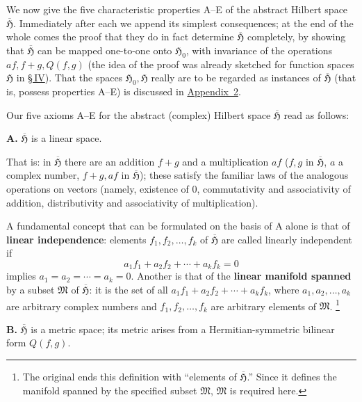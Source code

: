 \documentclass[fontsize=13pt,paper=b5,twoside,bookmarkpackage=false]{scrartcl}
\newcommand{\Sec}[1]{\hyperref[sec:#1]{\S\,#1}}
\newcommand{\App}[1]{\hyperref[app:#1]{Appendix~#1}}
\newcounter{translatornote}
\newcommand{\tnote}[1]{%
  \begingroup\stepcounter{translatornote}%
  \renewcommand{\thefootnote}{T\arabic{translatornote}}%
  \footnote[0]{#1}\endgroup}
\begin{document}
We now give the five characteristic properties A--E of the abstract Hilbert space $\overline{\mathfrak{H}}$. Immediately after each we append its simplest consequences; at the end of the whole comes the proof that they do in fact determine $\overline{\mathfrak{H}}$ completely, by showing that $\overline{\mathfrak{H}}$ can be mapped one-to-one onto $\mathfrak{H}_0$, with invariance of the operations $af,f+g,Q(f,g)$ (the idea of the proof was already sketched for function spaces $\mathfrak{H}$ in \Sec{IV}). That the spaces $\mathfrak{H}_0,\mathfrak{H}$ really are to be regarded as instances of $\overline{\mathfrak{H}}$ (that is, possess properties A--E) is discussed in \App{2}.

Our five axioms A--E for the abstract (complex) Hilbert space $\overline{\mathfrak{H}}$ read as follows:

\par\medskip\noindent\textbf{A.}\label{axiom:A}
$\overline{\mathfrak{H}}$ is a linear space.

That is: in $\overline{\mathfrak{H}}$ there are an addition $f+g$ and a multiplication $af$ ($f,g$ in $\overline{\mathfrak{H}}$, $a$ a complex number, $f+g,af$ in $\overline{\mathfrak{H}}$); these satisfy the familiar laws of the analogous operations on vectors (namely, existence of $0$, commutativity and associativity of addition, distributivity and associativity of multiplication).

A fundamental concept that can be formulated on the basis of A alone is that of \textbf{linear independence}: elements $f_1,f_2,\ldots,f_k$ of $\overline{\mathfrak{H}}$ are called linearly independent if
\[
a_1f_1+a_2f_2+\cdots+a_kf_k=0
\]
implies $a_1=a_2=\cdots=a_k=0$. Another is that of the \textbf{linear manifold spanned} by a subset $\mathfrak{M}$ of $\overline{\mathfrak{H}}$: it is the set of all $a_1f_1+a_2f_2+\cdots+a_kf_k$, where $a_1,a_2,\ldots,a_k$ are arbitrary complex numbers and $f_1,f_2,\ldots,f_k$ are arbitrary elements of $\mathfrak{M}$.\tnote{The original ends this definition with ``elements of $\overline{\mathfrak{H}}$.'' Since it defines the manifold spanned by the specified subset $\mathfrak{M}$, $\mathfrak{M}$ is required here.}

\par\medskip\noindent\textbf{B.}\label{axiom:B}
$\overline{\mathfrak{H}}$ is a metric space; its metric arises from a Hermitian-symmetric bilinear form $Q(f,g)$.
\end{document}
